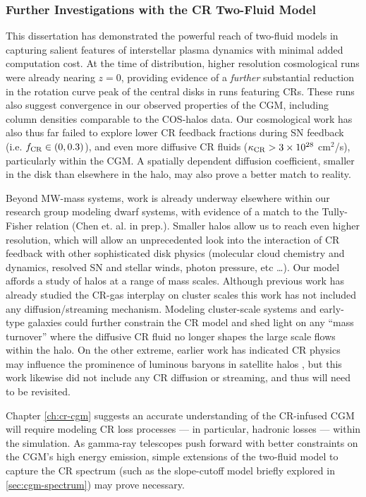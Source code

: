 \subsubsection{Further Investigations with the CR Two-Fluid Model}
\label{sec:two-fluid}
This dissertation has demonstrated the powerful reach of two-fluid models in capturing salient features of interstellar plasma dynamics with minimal added computation cost. At the time of distribution, higher resolution cosmological runs were already nearing $z=0$, providing evidence of a \emph{further} substantial reduction in the rotation curve peak of the central disks in runs featuring CRs. These runs also suggest convergence in our observed properties of the CGM, including column densities comparable to the COS-halos data. Our cosmological work has also thus far failed to explore lower CR feedback fractions during SN feedback (i.e. $f_{\rm CR} \in (0, 0.3)$), and even more diffusive CR fluids ($\kappa_{\rm CR} > 3 \times 10^{28}$ cm$^2$/s), particularly within the CGM. A spatially dependent diffusion coefficient, smaller in the disk than elsewhere in the halo, may also prove a better match to reality.

Beyond MW-mass systems, work is already underway elsewhere within our research group modeling dwarf systems, with evidence of a match to the Tully-Fisher relation (Chen et. al. in prep.). Smaller halos allow us to reach even higher resolution, which will allow an unprecedented look into the interaction of CR feedback with other sophisticated disk physics (molecular cloud chemistry and dynamics, resolved SN and stellar winds, photon pressure, etc \ldots ). Our model affords a study of halos at a range of mass scales. Although previous work has already studied the CR-gas interplay on cluster scales \citep[e.g.][]{Pfrommer2007,Pfrommer2008,Pfrommer2008b} this work has not included any diffusion/streaming mechanism. Modeling cluster-scale systems and early-type galaxies could further constrain the CR model and shed light on any ``mass turnover'' where the diffusive CR fluid no longer shapes the large scale flows within the halo. On the other extreme, earlier work has indicated CR physics may influence the prominence of luminous baryons in satellite halos \citep{Wadepuhl2011}, but this work likewise did not include any CR diffusion or streaming, and thus will need to be revisited.

Chapter \ref{ch:cr-cgm} suggests an accurate understanding of the CR-infused CGM will require modeling CR loss processes --- in particular, hadronic losses --- within the simulation. As gamma-ray telescopes push forward with better constraints on the CGM's high energy emission, simple extensions of the two-fluid model to capture the CR spectrum (such as the slope-cutoff model briefly explored in \ref{sec:cgm-spectrum}) may prove necessary. 


